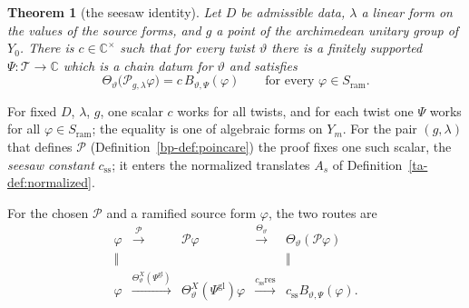 \documentclass[reqno]{amsart}
\theoremstyle{definition}
\theoremstyle{plain}
\newtheorem{theorem}{Theorem}[section]
\newcommand{\C}{\mathbb{C}}
\newcommand{\Pc}{\mathcal{P}}
\newcommand{\Tc}{\mathcal{T}}
\newcommand{\ram}{\mathrm{ram}}
\begin{document}
\begin{theorem}[the seesaw identity]\label{thm:seesaw}
Let \(D\) be admissible data, \(\lambda\) a linear form on the values of the source forms, and \(g\) a point of the archimedean unitary group of \(Y_0\).  There is \(c \in \C^\times\) such that for every twist \(\vartheta\) there is a finitely supported \(\Psi \colon \Tc \to \C\) which is a chain datum for \(\vartheta\) and satisfies
\[
  \Theta_\vartheta\bigl(\Pc_{g,\lambda}\varphi\bigr) = c\, B_{\vartheta,\Psi}(\varphi) \qquad\text{for every } \varphi \in S_{\ram} .
\]
\end{theorem}

For fixed \(D\), \(\lambda\), \(g\), one scalar \(c\) works for all twists, and for each twist one \(\Psi\) works for all \(\varphi \in S_{\ram}\); the equality is one of algebraic forms on \(Y_m\).  For the pair \((g,\lambda)\) that defines \(\Pc\) (Definition~\ref{bp-def:poincare}) the proof fixes one such scalar, the \emph{seesaw constant} \(c_{\mathrm{ss}}\); it enters the normalized translates \(A_s\) of Definition~\ref{ta-def:normalized}.

For the chosen \(\Pc\) and a ramified source form \(\varphi\), the two routes are
\[
  \begin{array}{ccccc}
    \varphi & \xrightarrow{\Pc} & \Pc\varphi
      & \xrightarrow{\Theta_\vartheta} & \Theta_\vartheta(\Pc\varphi) \\
    \Vert &&&& \Vert \\
    \varphi & \xrightarrow{\Theta^X_\vartheta(\Psi^{\mathrm{gl}})}
      & \Theta^X_\vartheta(\Psi^{\mathrm{gl}})\varphi
      & \xrightarrow{c_{\mathrm{ss}}\mathrm{res}} & c_{\mathrm{ss}}B_{\vartheta,\Psi}(\varphi).
  \end{array}
\]
\end{document}
